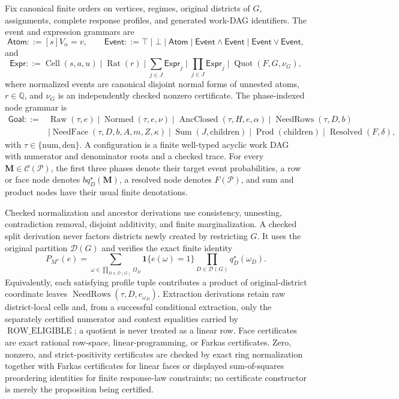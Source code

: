 Fix canonical finite orders on vertices, regimes, original districts of \(G\), assignments, complete response profiles, and generated work-DAG identifiers.  The event and expression grammars are
\[
\mathsf{Atom}::=[s]V_\alpha=v,
\qquad
\mathsf{Event}::=\top\mid\bot\mid\mathsf{Atom}\mid
\mathsf{Event}\wedge\mathsf{Event}\mid\mathsf{Event}\vee\mathsf{Event},
\]
and
\[
\mathsf{Expr}::=\operatorname{Cell}(s,a,u)\mid\operatorname{Rat}(r)
\mid\sum_{j\in J}\mathsf{Expr}_j
\mid\prod_{j\in J}\mathsf{Expr}_j
\mid\operatorname{Quot}(F,G,\nu_G),
\]
where normalized events are canonical disjoint normal forms of unnested atoms, \(r\in\mathbb Q\), and \(\nu_G\) is an independently checked nonzero certificate.  The phase-indexed node grammar is
\[
\begin{split}
\mathsf{Goal}::={}&\operatorname{Raw}(\tau,e)
\mid\operatorname{Normed}(\tau,e,\nu)
\mid\operatorname{AncClosed}(\tau,H,e,\alpha)
\mid\operatorname{NeedRows}(\tau,D,b)\\
&\mid\operatorname{NeedFace}(\tau,D,b,A,m,Z,\kappa)
\mid\operatorname{Sum}(J,\mathrm{children})
\mid\operatorname{Prod}(\mathrm{children})
\mid\operatorname{Resolved}(F,\delta),
\end{split}
\]
with \(\tau\in\{\mathrm{num},\mathrm{den}\}\).  A configuration is a finite well-typed acyclic work DAG with numerator and denominator roots and a checked trace.  For every \(\mathbf M\in\mathcal C(\mathcal P)\), the first three phases denote their target event probabilities, a row or face node denotes \(bq_D^\star(\mathbf M)\), a resolved node denotes \(F(\mathcal P)\), and sum and product nodes have their usual finite denotations.

Checked normalization and ancestor derivations use consistency, unnesting, contradiction removal, disjoint additivity, and finite marginalization.  A checked split derivation never factors districts newly created by restricting \(G\).  It uses the original partition \(\mathcal D(G)\) and verifies the exact finite identity
\[
P_{M^\star}(e)
=\sum_{\omega\in\prod_{D\in\mathcal D(G)}\Omega_D}
\mathbf 1\{e(\omega)=1\}
\prod_{D\in\mathcal D(G)}q_D^\star(\omega_D).
\]
Equivalently, each satisfying profile tuple contributes a product of original-district coordinate leaves \(\operatorname{NeedRows}(\tau,D,e_{\omega_D})\).  Extraction derivations retain raw district-local cells and, from a successful conditional extraction, only the separately certified numerator and context equalities carried by \(\operatorname{ROW\_ELIGIBLE}\); a quotient is never treated as a linear row.  Face certificates are exact rational row-space, linear-programming, or Farkas certificates.  Zero, nonzero, and strict-positivity certificates are checked by exact ring normalization together with Farkas certificates for linear faces or displayed sum-of-squares preordering identities for finite response-law constraints; no certificate constructor is merely the proposition being certified.

